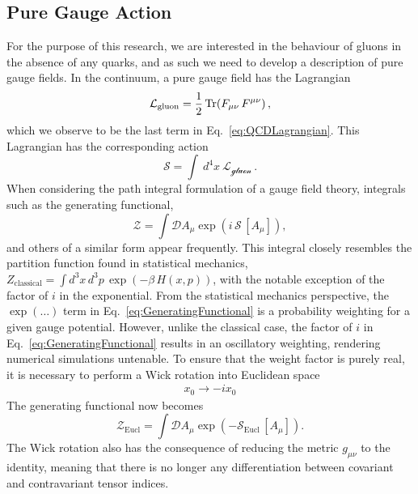 \subsection{Pure Gauge Action}
For the purpose of this research, we are interested in the behaviour of gluons in the absence of any quarks, and as such we need to develop a description of pure gauge fields. In the continuum, a pure gauge field has the Lagrangian~\cite{ryder1996quantum}
%
\begin{equation}
\mathcal{L}_{\text{gluon}}=\frac{1}{2}\operatorname{Tr}(F_{\mu\nu}\,F^{\mu\nu})\, ,
\label{eq:GaugeLagrangian}
\end{equation}
%
which we observe to be the last term in Eq.~\ref{eq:QCDLagrangian}. This Lagrangian has the corresponding action
%
\begin{equation}
\mathcal{S}=\int~d^4x~\mathcal{L_\text{gluon}}\, .
\label{eq:QCDAction}
\end{equation}
%
When considering the path integral formulation of a gauge field theory, integrals such as the generating functional,
%
\begin{equation}
\mathcal{Z} =\int \mathcal{D} A_\mu \exp\left(i\,\mathcal{S}\,[A_\mu]\right),
\label{eq:GeneratingFunctional}
\end{equation}
%
and others of a similar form appear frequently. This integral closely resembles the partition function found in statistical mechanics, $Z_{\text{classical}}=\int d^3x\,d^3p\,\exp\left(-\beta\,H(x,p)\right)$, with the notable exception of the factor of $i$ in the exponential. From the statistical mechanics perspective, the $\exp(\ldots)$ term in Eq.~\ref{eq:GeneratingFunctional} is a probability weighting for a given gauge potential. However, unlike the classical case, the factor of $i$ in Eq.~\ref{eq:GeneratingFunctional} results in an oscillatory weighting, rendering numerical simulations untenable. To ensure that the weight factor is purely real, it is necessary to perform a Wick rotation into Euclidean space~\cite{Schafer:1996wv,Wilson:1974sk}
\begin{align*}
x_0\rightarrow -ix_0
\end{align*}
The generating functional now becomes 
\begin{equation}
\mathcal{Z}_{\text{Eucl}} =\int \mathcal{D} A_\mu \exp\left(-\mathcal{S}_{\text{Eucl}}\,[A_\mu]\right).
\end{equation}
The Wick rotation also has the consequence of reducing the metric $g_{\mu\nu}$ to the identity, meaning that there is no longer any differentiation between covariant and contravariant tensor indices.\\

